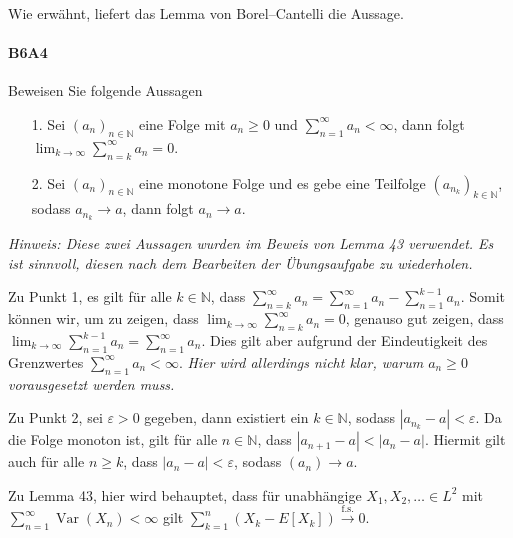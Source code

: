 \documentclass{article}
\begin{document}
Wie erwähnt, liefert das Lemma von Borel--Cantelli die Aussage.
\newpage

\paragraph{B6A4}
Beweisen Sie folgende Aussagen
\begin{enumerate}
\item[1.] Sei $(a_n)_{n\in\mathbb{N}}$ eine Folge mit $a_n\geq0$ und $\sum_{n=1}^\infty a_n<\infty$, dann folgt $\lim_{k\to\infty}\sum_{n=k}^\infty a_n=0$.
\item[2.] Sei $(a_n)_{n\in\mathbb{N}}$ eine monotone Folge und es gebe eine Teilfolge $(a_{n_k})_{k\in\mathbb{N}}$, sodass $a_{n_k}\to a$, dann folgt $a_n\to a$.
\end{enumerate}
\emph{Hinweis: Diese zwei Aussagen wurden im Beweis von Lemma 43 verwendet.
  Es ist sinnvoll, diesen nach dem Bearbeiten der Übungsaufgabe zu wiederholen.}

Zu Punkt 1, es gilt für alle $k\in\mathbb{N}$, dass $\sum_{n=k}^\infty a_n=\sum_{n=1}^\infty a_n-\sum_{n=1}^{k-1}a_n$.
Somit können wir, um zu zeigen, dass $\lim_{k\to\infty}\sum_{n=k}^\infty a_n=0$, genauso gut zeigen, dass $\lim_{k\to\infty}\sum_{n=1}^{k-1}a_n=\sum_{n=1}^\infty a_n$.
Dies gilt aber aufgrund der Eindeutigkeit des Grenzwertes $\sum_{n=1}^\infty a_n<\infty$.
\emph{Hier wird allerdings nicht klar, warum $a_n\geq0$ vorausgesetzt werden muss.}

Zu Punkt 2, sei $\varepsilon>0$ gegeben, dann existiert ein $k\in\mathbb{N}$, sodass $|a_{n_k}-a|<\varepsilon$.
Da die Folge monoton ist, gilt für alle $n\in\mathbb{N}$, dass $|a_{n+1}-a|<|a_{n}-a|$.
Hiermit gilt auch für alle $n\geq k$, dass $|a_n-a|<\varepsilon$, sodass $(a_n)\to a$.

Zu Lemma 43, hier wird behauptet, dass für unabhängige $X_1,X_2,\dots\in L^2$ mit  $\sum_{n=1}^\infty\operatorname{Var}(X_n)<\infty$ gilt $\sum_{k=1}^n(X_k-E[X_k])\xrightarrow{\text{f.s.}}0$.
\end{document}
